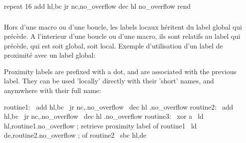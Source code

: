 %
%

\begin{code}
repeat 16
  add hl,bc
  jr nc,\at no\_overflow
  dec hl
\at no\_overflow
rend
\end{code}

\subsubsection{}

\begin{xfr}
Hors d'une macro ou d'une boucle, les labels locaux héritent du label global qui précède.
A l'interieur d'une boucle ou d'une macro, ils sont relatifs au label qui précède, qui est soit global, soit local.
Exemple d'utilisation d'un label de proximité avec un label global:
\end{xfr}

\begin{xen}
Proximity labels are prefixed with a dot, and are associated with the previous label.
They can be used 'locally' directly with their 'short' names, and anymwhere with their full name:
\end{xen}

\begin{code}
routine1:
\ add hl,bc
\ jr nc,.no\_overflow
\ dec hl
.no\_overflow
\medskip
routine2:
\ add hl,bc
\ jr nc,.no\_overflow
\ dec hl
.no\_overflow
\medskip
routine3:
\ xor a
\ ld hl,routine1.no\_overflow ; retrieve proximity label of routine1
\ ld de,routine2.no\_overflow ; of routine2
\ sbc hl,de
\end{code}

\subsubsection{}

